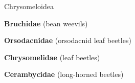 \documentclass[letterpaper,10pt]{article}
\begin{document}
{%
\makebox[0.40cm]{}  Chrysomeloidea \par
\makebox[0.6cm]{}  \textbf{Bruchidae} (bean weevils) \par
\makebox[0.6cm]{}  \textbf{Orsodacnidae} (orsodacnid leaf beetles) \par
\makebox[0.6cm]{}  \textbf{Chrysomelidae} (leaf beetles) \par
\makebox[0.6cm]{}  \textbf{Cerambycidae} (long-horned beetles) \par
}
\end{document}
